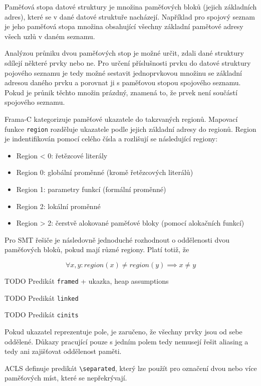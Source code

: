 Paměťová stopa datové struktury je množina paměťových bloků (jejich základních adres),
které se v dané datové struktuře nacházejí.
Například pro spojový seznam je jeho paměťová stopa množina
obsahující všechny základní pamětové adresy všech uzlů v daném seznamu.

Analýzou průniku dvou paměťových stop je možné určit,
zdali dané struktury sdílejí některé prvky nebo ne.
Pro určení příslušnosti prvku do datové struktury pojového seznamu
je tedy možné sestavit jednoprvkovou množinu se základní adresou daného prvku
a porovnat ji s paměťovou stopou spojového seznamu.
Pokud je průnik těchto množin prázdný,
znamená to, že prvek není součástí spojového seznamu.

Frama\mbox{-}C kategorizuje paměťové ukazatele do takzvaných regionů.
Mapovací funkce \texttt{region} rozděluje ukazatele podle jejich základní adresy do regionů.
Region je indentifikován pomocí celého čísla a rozlišují se následující regiony:

\begin{itemize}
    \item Region < 0: řetězcové literály
    \item Region 0: globální proměnné (kromě řetězcových literálů)
    \item Region 1: parametry funkcí (formální proměnné)
    \item Region 2: lokální proměnné
    \item Region > 2: čerstvě alokované paměťové bloky (pomocí alokačních funkcí)
\end{itemize}

Pro SMT řešiče je následovně jednoduché rozhodnout o oddělenosti dvou paměťových bloků,
pokud mají různé regiony.
Platí totiž, že

\begin{equation*}
    \forall x, y : region(x) \neq region(y) \implies x \neq y
\end{equation*}

TODO Predikát \texttt{framed} + ukazka, heap assumptions

TODO Predikát \texttt{linked}

TODO Predikát \texttt{cinits}

Pokud ukazatel reprezentuje pole,
je zaručeno, že všechny prvky jsou od sebe oddělené.
Důkazy pracující pouze s jedním polem tedy nemusejí řešit aliasing
a tedy ani zajišťovat oddělenost paměti.

ACLS definuje predikát \texttt{\textbackslash separated},
který lze použít pro označení dvou nebo více paměťových míst,
které se nepřekrývají.

